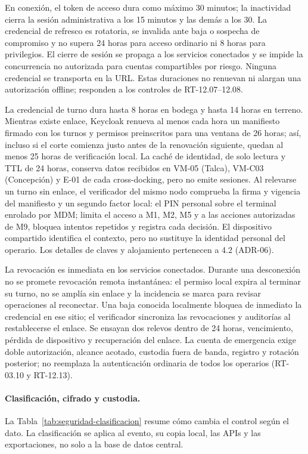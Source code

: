 En conexión, el token de acceso dura como máximo 30 minutos; la inactividad cierra la sesión administrativa a los 15 minutos y las demás a los 30. La credencial de refresco es rotatoria, se invalida ante baja o sospecha de compromiso y no supera 24 horas para acceso ordinario ni 8 horas para privilegios. El cierre de sesión se propaga a los servicios conectados y se impide la concurrencia no autorizada para cuentas compartibles por riesgo. Ninguna credencial se transporta en la URL. Estas duraciones no renuevan ni alargan una autorización offline; responden a los controles de RT-12.07--12.08.

La credencial de turno dura hasta 8 horas en bodega y hasta 14 horas en terreno. Mientras existe enlace, Keycloak renueva al menos cada hora un manifiesto firmado con los turnos y permisos preinscritos para una ventana de 26 horas; así, incluso si el corte comienza justo antes de la renovación siguiente, quedan al menos 25 horas de verificación local. La caché de identidad, de solo lectura y TTL de 24 horas, conserva datos recibidos en VM-05 (Talca), VM-C03 (Concepción) y E-01 de cada cross-docking, pero no emite sesiones. Al relevarse un turno sin enlace, el verificador del mismo nodo comprueba la firma y vigencia del manifiesto y un segundo factor local: el PIN personal sobre el terminal enrolado por MDM; limita el acceso a M1, M2, M5 y a las acciones autorizadas de M9, bloquea intentos repetidos y registra cada decisión. El dispositivo compartido identifica el contexto, pero no sustituye la identidad personal del operario. Los detalles de claves y alojamiento pertenecen a 4.2 (ADR-06).

La revocación es inmediata en los servicios conectados. Durante una desconexión no se promete revocación remota instantánea: el permiso local expira al terminar su turno, no se amplía sin enlace y la incidencia se marca para revisar operaciones al reconectar. Una baja conocida localmente bloquea de inmediato la credencial en ese sitio; el verificador sincroniza las revocaciones y auditorías al restablecerse el enlace. Se ensayan dos relevos dentro de 24 horas, vencimiento, pérdida de dispositivo y recuperación del enlace. La cuenta de emergencia exige doble autorización, alcance acotado, custodia fuera de banda, registro y rotación posterior; no reemplaza la autenticación ordinaria de todos los operarios (RT-03.10 y RT-12.13).

\paragraph{Clasificación, cifrado y custodia.}
La Tabla~\ref{tab:seguridad-clasificacion} resume cómo cambia el control según el dato. La clasificación se aplica al evento, su copia local, las APIs y las exportaciones, no solo a la base de datos central.

